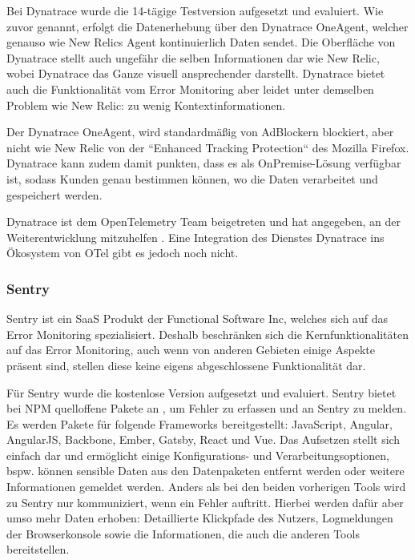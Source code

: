 Bei Dynatrace wurde die 14-tägige Testversion aufgesetzt und evaluiert. Wie zuvor genannt, erfolgt die Datenerhebung über den Dynatrace OneAgent, welcher genauso wie New Relics Agent kontinuierlich Daten sendet. Die Oberfläche von Dynatrace stellt auch ungefähr die selben Informationen dar wie New Relic, wobei Dynatrace das Ganze visuell ansprechender darstellt. Dynatrace bietet auch die Funktionalität vom Error Monitoring aber leidet unter demselben Problem wie New Relic: zu wenig Kontextinformationen.

Der Dynatrace OneAgent, wird standardmäßig von AdBlockern blockiert, aber nicht wie New Relic von der ``Enhanced Tracking Protection`` des Mozilla Firefox. Dynatrace kann zudem damit punkten, dass es als OnPremise-Lösung verfügbar ist, sodass Kunden genau bestimmen können, wo die Daten verarbeitet und gespeichert werden.

Dynatrace ist dem OpenTelemetry Team beigetreten und hat angegeben, an der Weiterentwicklung mitzuhelfen \cite{DynatraceJoinOTelProject}. Eine Integration des Dienstes Dynatrace ins Ökosystem von OTel gibt es jedoch noch nicht.

\subsubsection{Sentry}

Sentry \cite{Sentry} ist ein SaaS Produkt der Functional Software Inc, welches sich auf das Error Monitoring spezialisiert. Deshalb beschränken sich die Kernfunktionalitäten auf das Error Monitoring, auch wenn von anderen Gebieten einige Aspekte präsent sind, stellen diese keine eigens abgeschlossene Funktionalität dar.

Für Sentry wurde die kostenlose Version aufgesetzt und evaluiert. Sentry bietet bei NPM quelloffene Pakete an \cite{SentryJSGithub}, um Fehler zu erfassen und an Sentry zu melden. Es werden Pakete für folgende Frameworks bereitgestellt: JavaScript, Angular, AngularJS, Backbone, Ember, Gatsby, React und Vue. Das Aufsetzen stellt sich einfach dar und ermöglicht einige Konfigurations- und Verarbeitungsoptionen, bspw. können sensible Daten aus den Datenpaketen entfernt werden oder weitere Informationen gemeldet werden. Anders als bei den beiden vorherigen Tools wird zu Sentry nur kommuniziert, wenn ein Fehler auftritt. Hierbei werden dafür aber umso mehr Daten erhoben: Detaillierte Klickpfade des Nutzers, Logmeldungen der Browserkonsole sowie die Informationen, die auch die anderen Tools bereitstellen.

